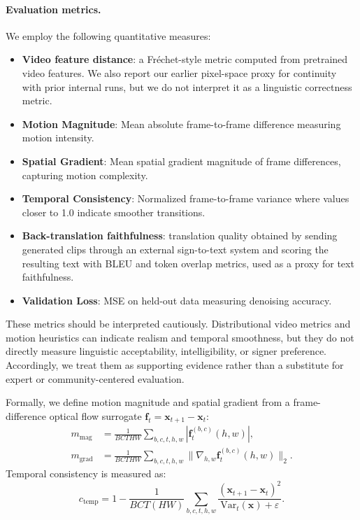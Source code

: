 \documentclass{ieeeaccess}
\begin{document}
\paragraph{Evaluation metrics.} We employ the following quantitative measures:
\begin{itemize}
    \item \textbf{Video feature distance}: a Fr\'echet-style metric computed from pretrained video features. We also report our earlier pixel-space proxy for continuity with prior internal runs, but we do not interpret it as a linguistic correctness metric.
    \item \textbf{Motion Magnitude}: Mean absolute frame-to-frame difference measuring motion intensity.
    \item \textbf{Spatial Gradient}: Mean spatial gradient magnitude of frame differences, capturing motion complexity.
    \item \textbf{Temporal Consistency}: Normalized frame-to-frame variance where values closer to 1.0 indicate smoother transitions.
    \item \textbf{Back-translation faithfulness}: translation quality obtained by sending generated clips through an external sign-to-text system and scoring the resulting text with BLEU and token overlap metrics, used as a proxy for text faithfulness.
    \item \textbf{Validation Loss}: MSE on held-out data measuring denoising accuracy.
\end{itemize}

These metrics should be interpreted cautiously. Distributional video metrics and motion heuristics can indicate realism and temporal smoothness, but they do not directly measure linguistic acceptability, intelligibility, or signer preference. Accordingly, we treat them as supporting evidence rather than a substitute for expert or community-centered evaluation.

Formally, we define motion magnitude and spatial gradient from a frame-difference optical flow surrogate $\mathbf{f}_t = \mathbf{x}_{t+1} - \mathbf{x}_t$:
\begin{align}
    m_\mathrm{mag} &= \frac{1}{BCTHW}\sum_{b,c,t,h,w} |\mathbf{f}^{(b,c)}_t(h,w)|, \\
    m_\mathrm{grad} &= \frac{1}{BCTHW}\sum_{b,c,t,h,w} \|\nabla_{h,w} \mathbf{f}^{(b,c)}_t(h,w)\|_2.
\end{align}
Temporal consistency is measured as:
\begin{equation}
    c_\mathrm{temp} = 1 - \frac{1}{BCT(HW)}\sum_{b,c,t,h,w} \frac{(\mathbf{x}_{t+1}-\mathbf{x}_t)^2}{\mathrm{Var}_t(\mathbf{x}) + \varepsilon}.
\end{equation}
\end{document}
